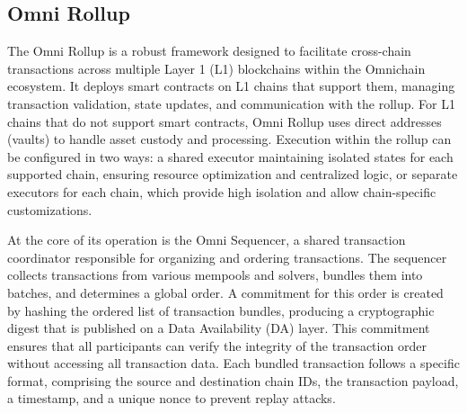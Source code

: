 \subsection{Omni Rollup}

The Omni Rollup is a robust framework designed to facilitate cross-chain transactions across multiple Layer 1 (L1) blockchains within the Omnichain ecosystem. It deploys smart contracts on L1 chains that support them, managing transaction validation, state updates, and communication with the rollup. For L1 chains that do not support smart contracts, Omni Rollup uses direct addresses (vaults) to handle asset custody and processing. Execution within the rollup can be configured in two ways: a shared executor maintaining isolated states for each supported chain, ensuring resource optimization and centralized logic, or separate executors for each chain, which provide high isolation and allow chain-specific customizations.  

At the core of its operation is the Omni Sequencer, a shared transaction coordinator responsible for organizing and ordering transactions. The sequencer collects transactions from various mempools and solvers, bundles them into batches, and determines a global order. A commitment for this order is created by hashing the ordered list of transaction bundles, producing a cryptographic digest that is published on a Data Availability (DA) layer. This commitment ensures that all participants can verify the integrity of the transaction order without accessing all transaction data. Each bundled transaction follows a specific format, comprising the source and destination chain IDs, the transaction payload, a timestamp, and a unique nonce to prevent replay attacks.  

